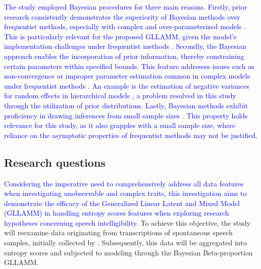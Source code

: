 \documentclass[
  authoryear,
  preprint,
  1p]{elsarticle}
\begin{document}
\textcolor{blue}{The study employed Bayesian procedures for three main reasons. Firstly,
prior research consistently demonstrates the superiority of Bayesian
methods over frequentist methods, especially with complex and
over-parameterized models \citep{Baker_1998, Kim_et_al_1999}. This is
particularly relevant for the proposed GLLAMM, given the model's
implementation challenges under frequentist methods
\citep{Depaoli_2014}. Secondly, the Bayesian approach enables the
incorporation of prior information, thereby constraining certain
parameters within specified bounds. This feature addresses issues such
as non-convergence or improper parameter estimation common in complex
models under frequentist methods
\citep{Martin_et_al_1975, Seaman_et_al_2011}. An example is the
estimation of negative variances for random effects in hierarchical
models \citep{Holmes_et_al_2019}, a problem resolved in this study
through the utilization of prior distributions. Lastly, Bayesian methods
exhibit proficiency in drawing inferences from small sample sizes
\citep{Baldwin_et_al_2013, Lambert_et_al_2005, Depaoli_2014}. This
property holds relevance for this study, as it also grapples with a
small sample size, where reliance on the asymptotic properties of
frequentist methods may not be justified.}

\subsection{Research questions}\label{sec-I-RQ}

\textcolor{blue}{Considering the imperative need to comprehensively address all data
features when investigating unobservable and complex traits, this
investigation aims to demonstrate the efficacy of the Generalized Linear
Latent and Mixed Model (GLLAMM) in handling entropy scores features when
exploring research hypotheses concerning speech intelligibility.} To
achieve this objective, the study will reexamine data originating from
transcriptions of spontaneous speech samples, initially collected by
\citet{Boonen_et_al_2021}. Subsequently, this data will be aggregated
into entropy scores and subjected to modeling through the Bayesian
Beta-proportion GLLAMM.
\end{document}
